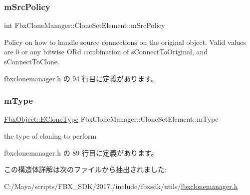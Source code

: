 \mbox{\label{struct_fbx_clone_manager_1_1_clone_set_element_a0619286ee827ce3e9adcb8914c4af9f1}} 
\subsubsection{\texorpdfstring{m\+Src\+Policy}{mSrcPolicy}}
{\footnotesize\ttfamily int Fbx\+Clone\+Manager\+::\+Clone\+Set\+Element\+::m\+Src\+Policy}

Policy on how to handle source connections on the original object. Valid values are 0 or any bitwise OR\textquotesingle{}d combination of s\+Connect\+To\+Original, and s\+Connect\+To\+Clone. 

 fbxclonemanager.\+h の 94 行目に定義があります。

\mbox{\label{struct_fbx_clone_manager_1_1_clone_set_element_a387497db4d5a0764a947835e5b234393}} 
\subsubsection{\texorpdfstring{m\+Type}{mType}}
{\footnotesize\ttfamily \hyperlink{class_fbx_object_a9f5626b2d2135684d6ea1e6e4ad2acbb}{Fbx\+Object\+::\+E\+Clone\+Type} Fbx\+Clone\+Manager\+::\+Clone\+Set\+Element\+::m\+Type}



the type of cloning to perform 



 fbxclonemanager.\+h の 89 行目に定義があります。



この構造体詳解は次のファイルから抽出されました\+:\begin{DoxyCompactItemize}
\item 
C\+:/\+Maya/scripts/\+F\+B\+X\+\_\+\+S\+D\+K/2017./include/fbxsdk/utils/\hyperlink{fbxclonemanager_8h}{fbxclonemanager.\+h}\end{DoxyCompactItemize}
